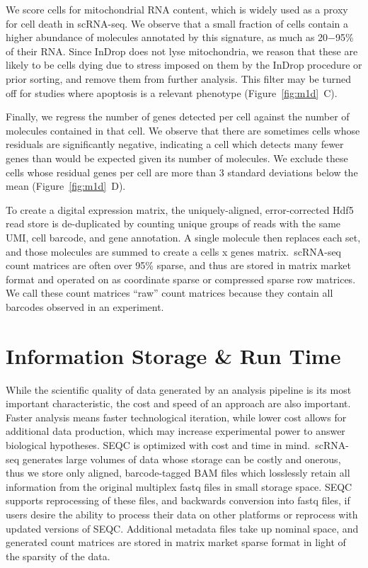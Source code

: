 We score cells for mitochondrial RNA content, which is widely used as a proxy for cell death in scRNA-seq. 
We observe that a small fraction of cells contain a higher abundance of molecules annotated by this signature, as much as 20−95\% of their RNA\@. 
Since InDrop does not lyse mitochondria, we reason that these are likely to be cells dying due to stress imposed on them by the InDrop procedure or prior sorting, and remove them from further analysis. %
This filter may be turned off for studies where apoptosis is a relevant phenotype (Figure~\ref{fig:m1d}~C).

Finally, we regress the number of genes detected per cell against the number of molecules contained in that cell. 
We observe that there are sometimes cells whose residuals are significantly negative, indicating a cell which detects many fewer genes than would be expected given its number of molecules. 
We exclude these cells whose residual genes per cell are more than 3 standard deviations
below the mean (Figure~\ref{fig:m1d}~D).

To create a digital expression matrix, the uniquely-aligned, error-corrected Hdf5 read store is de-duplicated by counting unique groups of reads with the same UMI, cell barcode, and gene annotation. 
A single molecule then replaces each set, and those molecules are summed to create a cells x genes matrix.\ 
scRNA-seq count matrices are often over 95\% sparse, and thus are stored in matrix market format and operated on as coordinate sparse or compressed sparse row matrices. 
We call these count matrices ``raw'' count matrices because they contain all barcodes observed in an experiment.

\section{Information Storage \& Run Time}

While the scientific quality of data generated by an analysis pipeline is its most important characteristic, the cost and speed of an approach are also important. 
Faster analysis means faster technological iteration, while lower cost allows for additional data production, which may increase experimental power to answer biological hypotheses. 
SEQC is optimized with cost and time in mind.\ 
scRNA-seq generates large volumes of data whose storage can be costly and onerous, thus we store only aligned, barcode-tagged BAM files which losslessly retain all information from the original multiplex fastq files in small storage space. 
SEQC supports reprocessing of these files, and backwards conversion into fastq files, if users desire the ability to process their data on other platforms or reprocess with updated versions of SEQC\@. 
Additional metadata files take up nominal space, and generated count matrices are stored in matrix market sparse format in light of the sparsity of the data. 

